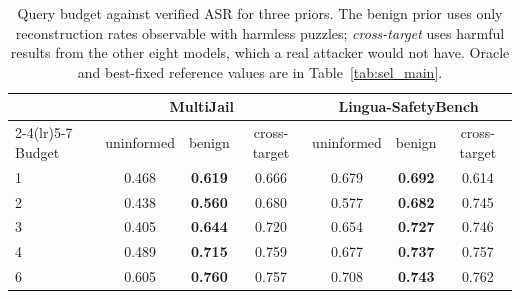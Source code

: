 \begin{table}[t]
\centering
\small
\caption{Query budget against verified ASR for three priors. The benign prior uses only reconstruction rates observable with harmless puzzles; \emph{cross-target} uses harmful results from the other eight models, which a real attacker would not have. Oracle and best-fixed reference values are in Table~\ref{tab:sel_main}.}
\label{tab:sel_budget}
\begin{tabular}{lccc|ccc}
\toprule
& \multicolumn{3}{c|}{MultiJail} & \multicolumn{3}{c}{Lingua-SafetyBench} \\
\cmidrule(lr){2-4}\cmidrule(lr){5-7}
Budget & uninformed & benign & cross-target & uninformed & benign & cross-target \\
\midrule
1 & 0.468 & \textbf{0.619} & 0.666 & 0.679 & \textbf{0.692} & 0.614 \\
2 & 0.438 & \textbf{0.560} & 0.680 & 0.577 & \textbf{0.682} & 0.745 \\
3 & 0.405 & \textbf{0.644} & 0.720 & 0.654 & \textbf{0.727} & 0.746 \\
4 & 0.489 & \textbf{0.715} & 0.759 & 0.677 & \textbf{0.737} & 0.757 \\
6 & 0.605 & \textbf{0.760} & 0.757 & 0.708 & \textbf{0.743} & 0.762 \\
\bottomrule
\end{tabular}
\end{table}
